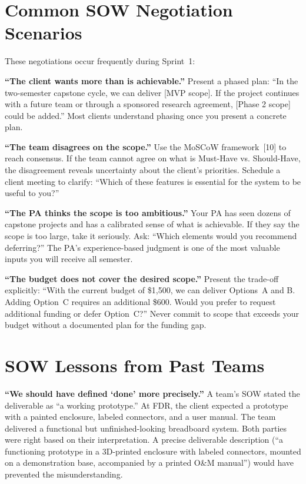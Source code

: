 \section{Common SOW Negotiation Scenarios}
These negotiations occur frequently during Sprint~1:

\textbf{``The client wants more than is achievable.''} Present a phased plan: ``In the two-semester capstone cycle, we can deliver [MVP scope]. If the project continues with a future team or through a sponsored research agreement, [Phase 2 scope] could be added.'' Most clients understand phasing once you present a concrete plan.

\textbf{``The team disagrees on the scope.''} Use the MoSCoW framework~[10] to reach consensus. If the team cannot agree on what is Must-Have vs. Should-Have, the disagreement reveals uncertainty about the client's priorities. Schedule a client meeting to clarify: ``Which of these features is essential for the system to be useful to you?''

\textbf{``The PA thinks the scope is too ambitious.''} Your PA has seen dozens of capstone projects and has a calibrated sense of what is achievable. If they say the scope is too large, take it seriously. Ask: ``Which elements would you recommend deferring?'' The PA's experience-based judgment is one of the most valuable inputs you will receive all semester.

\textbf{``The budget does not cover the desired scope.''} Present the trade-off explicitly: ``With the current budget of \$1,500, we can deliver Options~A and B. Adding Option~C requires an additional \$600. Would you prefer to request additional funding or defer Option~C?'' Never commit to scope that exceeds your budget without a documented plan for the funding gap.



\section{SOW Lessons from Past Teams}
\textbf{``We should have defined `done' more precisely.''} A team's SOW stated the deliverable as ``a working prototype.'' At FDR, the client expected a prototype with a painted enclosure, labeled connectors, and a user manual. The team delivered a functional but unfinished-looking breadboard system. Both parties were right based on their interpretation. A precise deliverable description (``a functioning prototype in a 3D-printed enclosure with labeled connectors, mounted on a demonstration base, accompanied by a printed O\&M manual'') would have prevented the misunderstanding.

